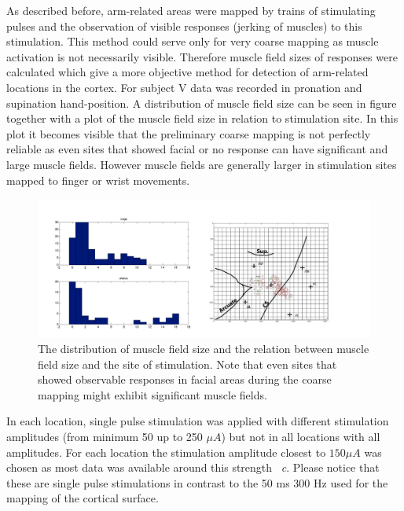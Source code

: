 As described before, arm-related areas were mapped by trains of stimulating pulses and the observation of visible responses (jerking of muscles) to this stimulation. This method could serve only for very coarse mapping as muscle activation is not necessarily visible. Therefore muscle field sizes of responses were calculated which give a more objective method for detection of arm-related locations in the cortex. For subject V data was recorded in pronation and supination hand-position.
A distribution of muscle field size can be seen in figure~ together with a plot of the muscle field size in relation to stimulation site. In this plot it becomes visible that the preliminary coarse mapping is not perfectly reliable as even sites that showed facial or no response can have significant and large muscle fields. However muscle fields are generally larger in stimulation sites mapped to finger or wrist movements. 
\begin{figure}[ht]
    \centering
        \includegraphics[width=\textwidth]{images/responses.jpg}
    \caption{The distribution of muscle field size and the relation between muscle field size and the site of stimulation. Note that even sites that showed observable responses in facial areas during the coarse mapping might exhibit significant muscle fields.}
    \label{sg:fig:images_responses}
\end{figure}

In each location, single pulse stimulation was applied with different stimulation amplitudes (from minimum 50 up to 250 $\mu A$) but not in all locations with all amplitudes. For each location the stimulation amplitude closest to $150 \mu A$ was chosen as most data was available around this strength~ \emph{c}. Please notice that these are single pulse stimulations in contrast to the 50 ms \@ 300 Hz used for the mapping of the cortical surface.

